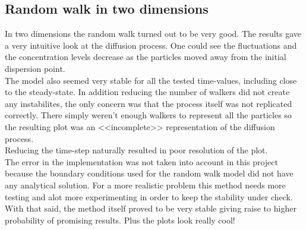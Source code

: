 \documentclass[a4paper,11pt]{article}
\newcommand{\vsp}{\vspace{0.2cm}} %
\begin{document}
\subsection{Random walk in two dimensions}
    In two dimensions the random walk turned out to be very good. The results gave a very intuitive look at the diffusion process. One could see the fluctuations and the concentration levels decrease as the particles moved away from the initial dispersion point.\\
    The model also seemed very stable for all the tested time-values, including close to the steady-state. In addition reducing the number of walkers did not create any instabilites, the only concern was that the process itself was not replicated correctly. There simply weren't enough walkers to represent all the particles so the resulting plot was an <<incomplete>> representation of the diffusion process.\vsp \\
    Reducing the time-step naturally resulted in poor resolution of the plot.\vsp \\
    The error in the implementation was not taken into account in this project because the boundary conditions used for the random walk model did not have any analytical solution. For a more realistic problem this method needs more testing and alot more experimenting in order to keep the stability under check. With that said, the method itself proved to be very stable giving raise to higher probability of promising results. Plus the plots look really cool!
\end{document}
